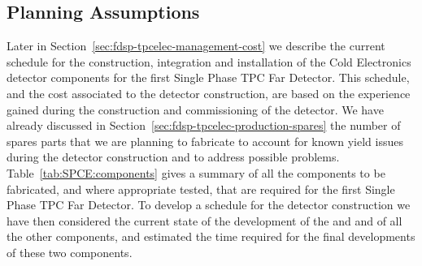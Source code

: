 \subsection{Planning Assumptions}
\label{sec:fdsp-tpcelec-management-planning}

Later in Section~\ref{sec:fdsp-tpcelec-management-cost} we describe
the current schedule for the construction, integration and installation
of the Cold Electronics detector components for the first Single
Phase TPC Far Detector. This schedule, and the cost associated
to the detector construction, are based on the experience gained
during the construction and commissioning of the 
detector. We have already discussed in Section~\ref{sec:fdsp-tpcelec-production-spares}
the number of spares parts that we are planning to fabricate to
account for known yield issues during the detector construction
and to address possible problems. Table~\ref{tab:SPCE:components}
gives a summary of all the components to be fabricated, and where
appropriate tested, that are required for the first Single Phase
TPC Far Detector.
To develop a schedule for the detector construction 
we have then considered the current state of the development of 
the  and  and of all the other components, 
and estimated the time required for the final developments of these
two components.

